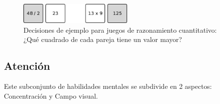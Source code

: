 \begin{itemize}
\begin{figure}[H]
  \begin{center}
    \includegraphics[width=0.5\textwidth]{./images/quantitative-reasoning.png}
    \caption[Juego de razonamiento cuantitativo]{Decisiones de ejemplo para juegos de razonamiento cuantitativo: ¿Qué cuadrado de cada pareja tiene un valor mayor?}
  \end{center}  
\end{figure}

\end{itemize}

\subsection{Atención}

Este subconjunto de habilidades mentales se subdivide en 2 aspectos: Concentración y Campo visual.

